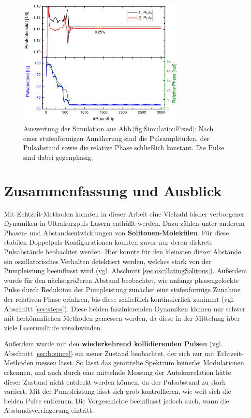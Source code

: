 \documentclass[bachelor,       %
               twoside,        %
               BCOR10mm,       %
               liststotoc,nomtotoc,bibtotoc, %
               english,ngerman, %
               final,          %
               ]{GAUBM}
\begin{document}
\begin{figure}[!htb]
	\centering
	\includegraphics[width=0.75\textwidth]{figures/SimRBFixed}
	\caption{Auswertung der Simulation aus Abb.\ref{fig:SimulationFixed}: Nach einer stufenförmigen Annäherung sind die Pulsamplituden, der Pulsabstand sowie die relative Phase schließlich konstant. Die Pulse sind dabei gegenphasig.}
	\label{fig:SimRBFix}
\end{figure}

\chapter{Zusammenfassung und Ausblick}
Mit Echtzeit-Methoden  konnten in dieser Arbeit eine Vielzahl bisher verborgener Dynamiken in Ultrakurzpuls-Lasern enthüllt werden.
Dazu zählen unter anderem Phasen- und Abstandsentwicklungen von \textbf{Solitonen-Molekülen}.
Für diese stabilen Doppelpuls-Konfigurationen konnten zuvor nur deren diskrete Pulsabstände beobachtet werden.
Hier konnte für den kleinsten dieser Abstände ein oszillatorisches Verhalten detektiert werden, welches stark von der Pumpleistung beeinflusst wird (vgl. Abschnitt \ref{sec:oscillatingSolitons}).
Außerdem wurde für den nächstgrößeren Abstand beobachtet, wie anfangs phasengelockte Pulse durch Reduktion der Pumpleistung zunächst eine stufenförmige Zunahme der relativen Phase erfahren, bis diese schließlich kontinuierlich zunimmt (vgl. Abschnitt \ref{sec:steps}).
Diese beiden faszinierenden Dynamiken können nur schwer mit herkömmlichen Methoden gemessen werden, da diese in der Mittelung über viele Laserumläufe verschwinden.

Außerdem wurde mit den \textbf{wiederkehrend kollidierenden Pulsen} (vgl. Abschnitt \ref{sec:bounce}) ein neuer Zustand beobachtet, der sich nur mit Echtzeit-Methoden messen lässt.
So lässt das gemittelte Spektrum keinerlei Modulationen erkennen, und auch durch eine mittelnde Messung der Autokorrelation hätte dieser Zustand nicht entdeckt werden können, da der Pulsabstand zu stark variiert.
Mit der Pumpleistung lässt sich grob kontrollieren, wie weit sich die beiden Pulse entfernen.
Die Vorgeschichte beeinflusst jedoch auch, wann die Abstandsverringerung eintritt.
\end{document}
